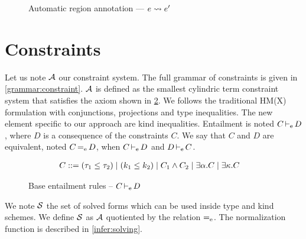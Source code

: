 \begin{figure*}[!hbt]
  \centering
  
  \caption{Automatic region annotation --- $e \rightsquigarrow e'$}
  \label{fig:region-annotation}
\end{figure*}


\section{Constraints}
\label{appendix:constraints}


Let us note $\mathcal A$ our constraint system. The full grammar of constraints is
given in \cref{grammar:constraint}.
$\mathcal A$ is defined as the smallest cylindric term constraint system that
satisfies the axiom shown in \cref{rules:entail}.
We follows the traditional HM(X) formulation
with conjunctions, projections and type inequalities.
The new element specific to our approach are kind inequalities.
Entailment is noted $C \operatorname{\vdash_e} D$, where $D$ is a consequence of the
constraints $C$.
We say that $C$ and $D$ are equivalent, noted $C \operatorname{=_e} D$,
when $C \operatorname{\vdash_e} D$ and $D \operatorname{\vdash_e} C$.

\begin{figure}[btp]
  \centering
  \begin{align*}
    C &::= (\tau_1 \leq \tau_2)
        \mid (k_1 \leq k_2)
        \mid C_1 \wedge C_2
        \mid \exists \alpha.C
        \mid \exists \kappa.C
  \end{align*}
  \caption{The constraint language}
  \label{grammar:constraint}
  
  \caption{Base entailment rules -- $C \operatorname{\vdash_e} D$ }
  \label{rules:entail}
\end{figure}


We note $\mathcal S$ the set of solved forms
which can be used inside type and kind schemes.
We define $\mathcal S$ as $\mathcal A$ quotiented by the relation $\operatorname{=_e}$.
%
The normalization function is described in \cref{infer:solving}.



